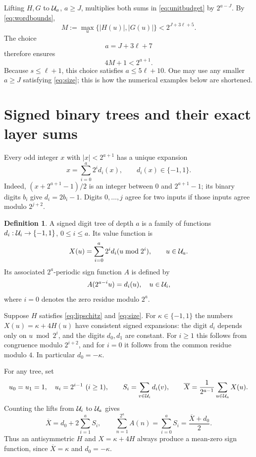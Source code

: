 \documentclass[11pt,a4paper]{article}
\theoremstyle{definition}\newtheorem{definition}[theorem]{Definition}
\theoremstyle{remark}\newtheorem{remark}[theorem]{Remark}
\begin{document}
Lifting $H,G$ to $\mathcal U_a$, $a\ge J$, multiplies both sums in
\eqref{eq:unitbudget} by $2^{a-J}$. By \eqref{eq:wordbounds},
\[
 M:=\max_{u}\{|H(u)|,|G(u)|\}<2^{J+3\ell+5}.
\]
The choice
\begin{equation}\label{eq:adepth}
 a=J+3\ell+7
\end{equation}
therefore ensures
\begin{equation}\label{eq:size}
 4M+1<2^{a+1}.
\end{equation}
Because $s\le\ell+1$, this choice satisfies $a\le5\ell+10$.
One may use any smaller $a\ge J$ satisfying \eqref{eq:size}; this
is how the numerical examples below are shortened.

\section{Signed binary trees and their exact layer sums}
Every odd integer $x$ with $|x|<2^{a+1}$ has a unique expansion
\begin{equation}\label{eq:signed}
 x=\sum_{i=0}^{a}2^i d_i(x),\qquad d_i(x)\in\{-1,1\}.
\end{equation}
Indeed, $(x+2^{a+1}-1)/2$ is an integer between $0$ and
$2^{a+1}-1$; its binary digits $b_i$ give $d_i=2b_i-1$.
Digits $0,\ldots,j$ agree for two inputs if those inputs agree
modulo $2^{j+2}$.

\begin{definition}
A signed digit tree of depth $a$ is a family of functions
$d_i:\mathcal U_i\to\{-1,1\}$, $0\le i\le a$. Its value function is
\[
 X(u)=\sum_{i=0}^a2^i d_i(u\bmod2^i),\qquad u\in\mathcal U_a.
\]
Its associated $2^a$-periodic sign function $A$ is defined by
\[
 A(2^{a-i}u)=d_i(u),\quad u\in\mathcal U_i,
\]
where $i=0$ denotes the zero residue modulo $2^a$.
\end{definition}

Suppose $H$ satisfies \eqref{eq:lipschitz} and \eqref{eq:size}.
For $\kappa\in\{-1,1\}$ the numbers
$X(u)=\kappa+4H(u)$ have consistent signed expansions: the digit $d_i$
depends only on $u\bmod2^i$, and the digits $d_0,d_1$ are constant.
For $i\ge1$ this follows from congruence modulo $2^{i+2}$, and
for $i=0$ it follows from the common residue modulo $4$.
In particular $d_0=-\kappa$.

For any tree, set
\[
 u_0=u_1=1,\quad u_i=2^{i-1}\ (i\ge1),\qquad
 S_i=\sum_{v\in\mathcal U_i}d_i(v),\qquad
 \overline X=\frac1{2^{a-1}}\sum_{u\in\mathcal U_a}X(u).
\]
Counting the lifts from $\mathcal U_i$ to $\mathcal U_a$ gives
\begin{equation}\label{eq:mean}
 \overline X=d_0+2\sum_{i=1}^a S_i,
 \qquad \sum_{n=1}^{2^a}A(n)=\sum_{i=0}^aS_i
       =\frac{\overline X+d_0}{2}.
\end{equation}
Thus an antisymmetric $H$ and $X=\kappa+4H$ always produce a
mean-zero sign function, since $\overline X=\kappa$ and $d_0=-\kappa$.
\end{document}
